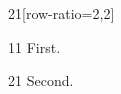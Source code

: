 \documentclass[paper=A4]{ropas-poster}
\begin{document}
\begin{postergrid}{2}{1}[row-ratio={2,2}]
\begin{posterblock}{1}{1}
First.
\end{posterblock}
\begin{posterblock}{2}{1}
Second.
\end{posterblock}
\end{postergrid}
\end{document}
